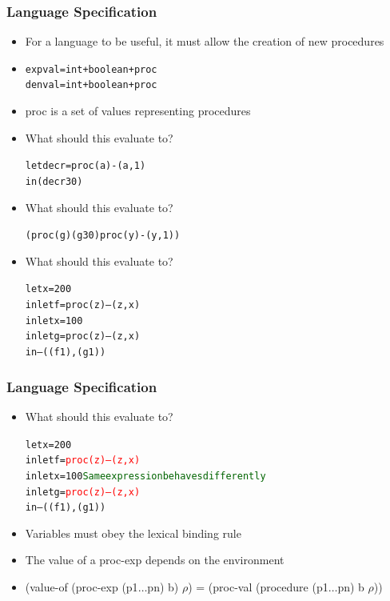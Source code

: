 \documentclass{beamer}
\newcommand{\dotss}{\(\ldots\)}
\begin{document}
\begin{frame}[fragile]
\frametitle{Language Specification}
\begin{scriptsize}
\begin{itemize}
\item<1-> For a language to be useful, it must allow the creation of new procedures

\item<1->
\begin{alltt}
     expval = int + boolean + proc
     denval = int + boolean + proc
\end{alltt}

\item<1-> proc is a set of values representing procedures

\item<2-> What should this evaluate to?
\begin{alltt}
     let decr = proc (a) -(a, 1)
     in (decr 30)
\end{alltt}

\item<3-> What should this evaluate to?
\begin{alltt}
     (proc (g) (g 30) proc (y) -(y, 1))
\end{alltt}

\item<4-> What should this evaluate to?
\begin{alltt}
     let x = 200
     in let f = proc (z) \textrm{–}(z, x)
		in let x = 100
		   in let g = proc (z) \textrm{–}(z, x)
		      in \textrm{–}((f 1), (g 1))
\end{alltt}

\end{itemize}
\end{scriptsize}
\end{frame}

\begin{frame}[fragile]
\frametitle{Language Specification}
\begin{scriptsize}
\begin{itemize}
\item<1-> What should this evaluate to?
\begin{alltt}
     let x = 200
     in let f = \textcolor{red}{proc (z) \textrm{–}(z, x)}
		in let x = 100        \textcolor{darkgreen}{Same expression behaves differently}
		   in let g = \textcolor{red}{proc (z) \textrm{–}(z, x)}
		      in \textrm{–}((f 1), (g 1))
\end{alltt}

\item<1-> Variables must obey the lexical binding rule

\item<1-> The value of a proc-exp depends on the environment

\item<2-> (value-of (proc-exp (p1\dotss{}pn) b) $\rho$) = (proc-val (procedure (p1\dotss{}pn) b $\rho$))

\end{itemize}
\end{scriptsize}
\end{frame}
\end{document}
